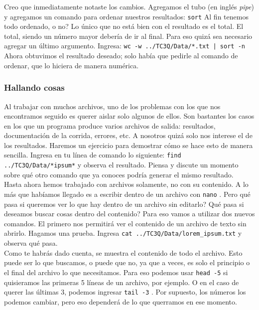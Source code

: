 \documentclass[10pt,letterpaper]{article}
\newcommand{\inlinecode}[1]{
\colorbox{light-gray}{\texttt{#1}}
}
\begin{document}
Creo que inmediatamente notaste los cambios. Agregamos el tubo (en ingl\'es \emph{pipe}) y agregamos un comando para ordenar nuestros resultados: \inlinecode{sort} Al fin tenemos todo ordenado, o no? Lo \'unico que no est\'a bien con el resultado es el total. El total, siendo un n\'umero mayor deber\'ia de ir al final. Para eso quiz\'a sea necesario agregar un \'ultimo argumento. Ingresa: \inlinecode{wc -w ../TC3Q/Data/*.txt | sort -n} Ahora obtuvimos el resultado deseado; solo hab\'ia que pedirle al comando de ordenar, que lo hiciera de manera num\'erica.

\subsubsection{Hallando cosas}
Al trabajar con muchos archivos, uno de los problemas con los que nos encontramos seguido es querer aislar solo algunos de ellos. Son bastantes los casos en los que un programa produce varios archivos de salida: resultados, documentaci\'on de la corrida, errores, etc. A nosotros quiz\'a solo nos interese el de los resultados. Haremos un ejercicio para demostrar c\'omo se hace esto de manera sencilla. Ingresa en tu l\'inea de comando lo siguiente: \inlinecode{find ../TC3Q/Data/*ipsum*} y observa el resultado. Piensa y discute un momento sobre qu\'e otro comando que ya conoces podr\'ia generar el mismo resultado.\\

Hasta ahora hemos trabajado con archivos solamente, no con su contenido. A lo m\'as que hab\'iamos llegado es a escribir dentro de un archivo con \inlinecode{nano}. Pero qu\'e pasa si queremos ver lo que hay dentro de un archivo sin editarlo? Qu\'e pasa si deseamos buscar cosas dentro del contenido? Para eso vamos a utilizar dos nuevos comandos. El primero nos permitir\'a ver el contenido de un archivo de texto sin abrirlo. Hagamos una prueba. Ingresa \inlinecode{cat ../TC3Q/Data/lorem\_ipsum.txt} y observa qu\'e pasa.\\

Como te habr\'as dado cuenta, se muestra el contenido de todo el archivo. Esto puede ser lo que buscamos, o puede que no, ya que a veces, es solo el principio o el final del archivo lo que necesitamos. Para eso podemos usar \inlinecode{head -5} si quisieramos las primeras 5 l\'ineas de un archivo, por ejemplo. O en el caso de querer las \'ultimas 3, podemos ingresar \inlinecode{tail -3}. Por supuesto, los n\'umeros los podemos cambiar, pero eso depender\'a de lo que querramos en ese momento.\\
\end{document}
